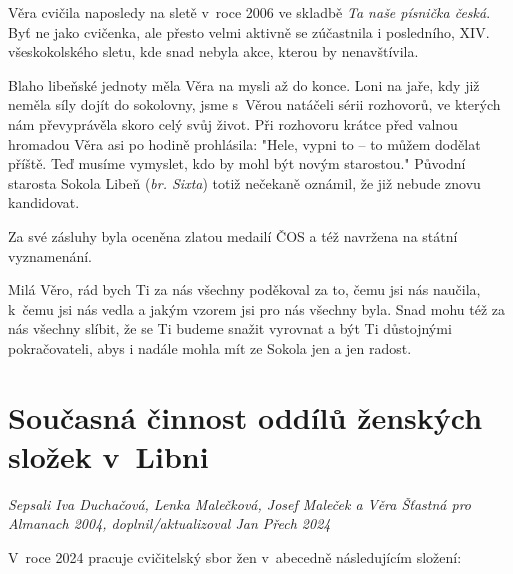 \documentclass[a5paper, 11pt, twoside]{article}
\begin{document}
Věra cvičila naposledy na sletě v~roce 2006 ve skladbě \textit{Ta naše
písnička česká}. Byť ne jako cvičenka, ale přesto velmi aktivně se
zúčastnila i posledního, XIV. všeskokolského sletu, kde snad nebyla
akce, kterou by nenavštívila.

Blaho libeňské jednoty měla Věra na mysli až do konce. Loni na jaře, kdy
již neměla síly dojít do sokolovny, jsme s~Věrou natáčeli sérii
rozhovorů, ve kterých nám převyprávěla skoro celý svůj život. Při
rozhovoru krátce před valnou hromadou Věra asi po hodině prohlásila:
"Hele, vypni to -- to můžem dodělat příště. Teď musíme vymyslet, kdo by
mohl být novým starostou." Původní starosta Sokola Libeň (\textit{br.
Sixta}) totiž nečekaně oznámil, že již nebude znovu kandidovat.

Za své zásluhy byla oceněna zlatou medailí ČOS a též navržena na státní
vyznamenání.

Milá Věro, rád bych Ti za nás všechny poděkoval za to, čemu jsi nás
naučila, k~čemu jsi nás vedla a jakým vzorem jsi pro nás všechny byla.
Snad mohu též za nás všechny slíbit, že se Ti budeme snažit vyrovnat a
být Ti důstojnými pokračovateli, abys i nadále mohla mít ze Sokola jen a
jen radost.

 \clearpage
\section{Současná činnost oddílů ženských složek
v~Libni}

\begin{center}
  \textit{Sepsali Iva Duchačová, Lenka Malečková, Josef Maleček a Věra
  Šťastná pro Almanach 2004, doplnil/aktualizoval Jan Přech 2024}
\end{center}

\noindent
V~roce 2024 pracuje cvičitelský sbor žen v~abecedně následujícím
složení:
\end{document}

